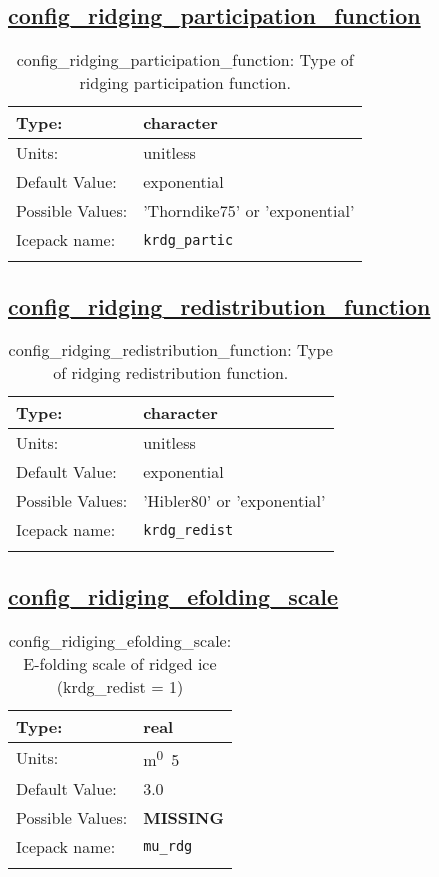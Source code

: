 \subsection[config\_ridging\_participation\_function]{\hyperref[sec:nm_tab_ridging]{config\_ridging\_participation\_function}}
\label{subsec:nm_sec_config_ridging_participation_function}
\begin{center}
\begin{longtable}{| p{2.0in} || p{4.0in} |}
    \hline
    Type: & character \\
    \hline
    Units: & \si{unitless} \\
    \hline
    Default Value: & exponential \\
    \hline
    Possible Values: & 'Thorndike75' or 'exponential' \\
    \hline
    Icepack name: & \verb+krdg_partic+ \\
    \hline
    \caption{config\_ridging\_participation\_function: Type of ridging participation function.}
\end{longtable}
\end{center}
\subsection[config\_ridging\_redistribution\_function]{\hyperref[sec:nm_tab_ridging]{config\_ridging\_redistribution\_function}}
\label{subsec:nm_sec_config_ridging_redistribution_function}
\begin{center}
\begin{longtable}{| p{2.0in} || p{4.0in} |}
    \hline
    Type: & character \\
    \hline
    Units: & \si{unitless} \\
    \hline
    Default Value: & exponential \\
    \hline
    Possible Values: & 'Hibler80' or 'exponential' \\
    \hline
    Icepack name: & \verb+krdg_redist+ \\
    \hline
    \caption{config\_ridging\_redistribution\_function: Type of ridging redistribution function.}
\end{longtable}
\end{center}
\subsection[config\_ridiging\_efolding\_scale]{\hyperref[sec:nm_tab_ridging]{config\_ridiging\_efolding\_scale}}
\label{subsec:nm_sec_config_ridiging_efolding_scale}
\begin{center}
\begin{longtable}{| p{2.0in} || p{4.0in} |}
    \hline
    Type: & real \\
    \hline
    Units: & \si{m^0.5} \\
    \hline
    Default Value: & 3.0 \\
    \hline
    Possible Values: & {\bf \color{red} MISSING} \\
    \hline
    Icepack name: & \verb+mu_rdg+ \\
    \hline
    \caption{config\_ridiging\_efolding\_scale: E-folding scale of ridged ice (krdg\_redist = 1)}
\end{longtable}
\end{center}
